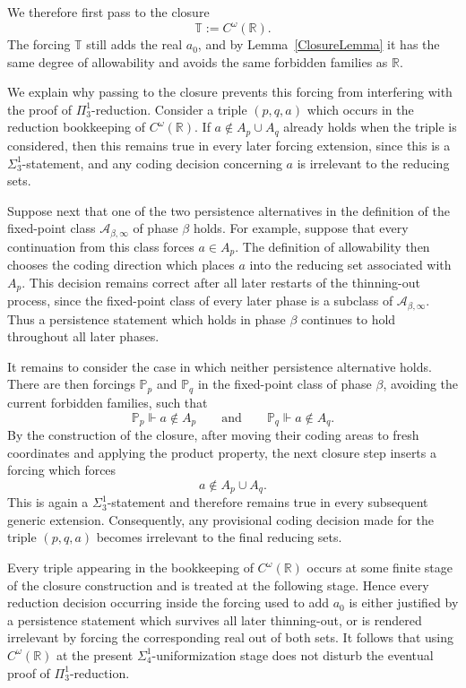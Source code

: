 \documentclass[a4paper,11pt]{article}
\newcommand{\forceP}{\mathbb{P}}
\newcommand{\forceR}{\mathbb{R}}
\begin{document}
We therefore first pass to the closure
\[
\mathbb T:=C^\omega(\forceR).
\]
The forcing $\mathbb T$ still adds the real $a_0$, and by Lemma~\ref{ClosureLemma} it has the same degree of allowability and avoids the same forbidden families as $\forceR$.

We explain why passing to the closure prevents this forcing from interfering with the proof of $\Pi^1_3$-reduction. Consider a triple $(p,q,a)$ which occurs in the reduction bookkeeping of $C^\omega(\forceR)$. If $a\notin A_p\cup A_q$ already holds when the triple is considered, then this remains true in every later forcing extension, since this is a $\Sigma^1_3$-statement, and any coding decision concerning $a$ is irrelevant to the reducing sets.

Suppose next that one of the two persistence alternatives in the definition of the fixed-point class $\mathcal A_{\beta,\infty}$ of phase $\beta$ holds. For example, suppose that every continuation from this class forces $a\in A_p$. The definition of allowability then chooses the coding direction which places $a$ into the reducing set associated with $A_p$. This decision remains correct after all later restarts of the thinning-out process, since the fixed-point class of every later phase is a subclass of $\mathcal A_{\beta,\infty}$. Thus a persistence statement which holds in phase $\beta$ continues to hold throughout all later phases.

It remains to consider the case in which neither persistence alternative holds. There are then forcings $\forceP_p$ and $\forceP_q$ in the fixed-point class of phase $\beta$, avoiding the current forbidden families, such that
\[
\forceP_p\Vdash a\notin A_p
\qquad\text{and}\qquad
\forceP_q\Vdash a\notin A_q.
\]
By the construction of the closure, after moving their coding areas to fresh coordinates and applying the product property, the next closure step inserts a forcing which forces
\[
a\notin A_p\cup A_q.
\]
This is again a $\Sigma^1_3$-statement and therefore remains true in every subsequent generic extension. Consequently, any provisional coding decision made for the triple $(p,q,a)$ becomes irrelevant to the final reducing sets.

Every triple appearing in the bookkeeping of $C^\omega(\forceR)$ occurs at some finite stage of the closure construction and is treated at the following stage. Hence every reduction decision occurring inside the forcing used to add $a_0$ is either justified by a persistence statement which survives all later thinning-out, or is rendered irrelevant by forcing the corresponding real out of both sets. It follows that using $C^\omega(\forceR)$ at the present $\Sigma^1_4$-uniformization stage does not disturb the eventual proof of $\Pi^1_3$-reduction.
\end{document}

